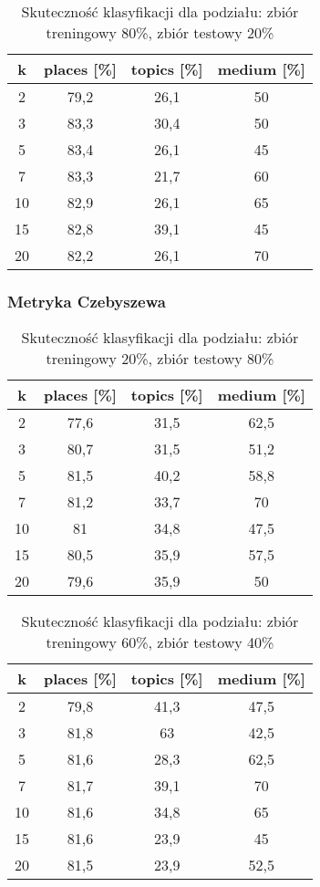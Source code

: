 \documentclass{classrep}
\begin{document}
\begin{table}[H]
	\centering
	\begin{tabular}{c c c c} 
		\hline
		\textbf{k} & \textbf{places [\%]} & \textbf{topics [\%]} &  \textbf{medium [\%]} \\ [0.5ex] 
		\hline
		\hline 
2 & 79,2 & 26,1 & 50 \\ 
3 & 83,3 & 30,4 & 50 \\ 
5 & 83,4 & 26,1 & 45 \\ 
7 & 83,3 & 21,7 & 60 \\ 
10 & 82,9 & 26,1 & 65 \\ 
15 & 82,8 & 39,1 & 45 \\ 
20 & 82,2 & 26,1 & 70 \\ 

		\hline
	\end{tabular}
	\caption{Skuteczność klasyfikacji dla podziału: zbiór treningowy 80\%, zbiór testowy 20\%}
\end{table}

\subsubsection{Metryka Czebyszewa}
\begin{table}[H]
	\centering
	\begin{tabular}{c c c c} 
		\hline
		\textbf{k} & \textbf{places [\%]} & \textbf{topics [\%]} &  \textbf{medium [\%]} \\ [0.5ex] 
		\hline
		\hline 
2 & 77,6 & 31,5 & 62,5 \\ 
3 & 80,7 & 31,5 & 51,2 \\ 
5 & 81,5 & 40,2 & 58,8 \\ 
7 & 81,2 & 33,7 & 70 \\ 
10 & 81 & 34,8 & 47,5 \\ 
15 & 80,5 & 35,9 & 57,5 \\ 
20 & 79,6 & 35,9 & 50 \\ 
		\hline
	\end{tabular}
	\caption{Skuteczność klasyfikacji dla podziału: zbiór treningowy 20\%, zbiór testowy 80\%}
\end{table}

\begin{table}[H]
	\centering
	\begin{tabular}{c c c c} 
		\hline
		\textbf{k} & \textbf{places [\%]} & \textbf{topics [\%]} &  \textbf{medium [\%]} \\ [0.5ex] 
		\hline
		\hline 
2 & 79,8 & 41,3 & 47,5 \\ 
3 & 81,8 & 63 & 42,5 \\ 
5 & 81,6 & 28,3 & 62,5 \\ 
7 & 81,7 & 39,1 & 70 \\ 
10 & 81,6 & 34,8 & 65 \\ 
15 & 81,6 & 23,9 & 45 \\ 
20 & 81,5 & 23,9 & 52,5 \\ 
		\hline
	\end{tabular}
	\caption{Skuteczność klasyfikacji dla podziału: zbiór treningowy 60\%, zbiór testowy 40\%}
\end{table}
\end{document}
